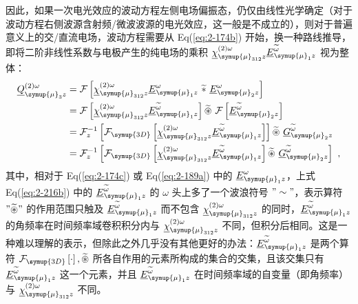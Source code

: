 因此，如果一次电光效应的波动方程左侧电场偏振态，仍仅由线性光学确定（对于波动方程右侧波源含射频/微波波源的电光效应，这一般是不成立的），则对于普遍意义上的交/直流电场，波动方程需要从 Eq(\ref{eq:2-174b}) 开始，换一种路线推导，即将二阶非线性系数与电极产生的纯电场的乘积 ${\underline{\chi}}^{(2)\omega}_{ {\symup{\mu}}_{312}z} \underline{E}^{\widetilde{\omega}}_{{\symup{\mu}}_1 z}$ 视为整体：
\begin{subequations} \label{eq:2-216}
	\abovedisplayskip=10pt
	\belowdisplayskip=10pt
	\begin{align}
		{\underline{Q}}^{(2)\omega}_{{\symup{\mu}}_{3}z} &= \mathcal F \left[ {\underline{\chi}}^{(2)\omega}_{ {\symup{\mu}}_{312}z} \underline{E}^\omega_{{\symup{\mu}}_1 z}\ \widetilde *\ \underline{E}^\omega_{{\symup{\mu}}_2 z} \right] \label{eq:2-216a} \\ &= \mathcal F \left[ {\underline{\chi}}^{(2)\omega}_{ {\symup{\mu}}_{312}z} \underline{E}^{\widetilde{\omega}}_{{\symup{\mu}}_1 z} \right] \widetilde \circledast\ \mathcal F \left[ \underline{E}^{\widetilde{\omega}}_{{\symup{\mu}}_2 z} \right]  \label{eq:2-216b} \\ &=\mathcal F^{-1}_{z} \left[ \mathcal F_{\symup{3D}} \left[ {\underline{\chi}}^{(2)\omega}_{ {\symup{\mu}}_{312}z} \underline{E}^{\widetilde{\omega}}_{{\symup{\mu}}_1 z} \right] \right] \widetilde \circledast\ \underline{G}^{\widetilde{\omega}}_{{\symup{\mu}}_2 z} \label{eq:2-216c} \\ &=\mathcal F^{-1}_{z} \left[ \mathcal F_{\symup{3D}} \left[ {\underline{\chi}}^{(2)\omega}_{ {\symup{\mu}}_{312}z} \underline{E}^{\widetilde{\omega}}_{{\symup{\mu}}_1 z} \right] \widetilde \circledast\ \underline{G}^{\widetilde{\omega}}_{{\symup{\mu}}_2 z} \right] \label{eq:2-216d}~,
	\end{align}
\end{subequations}
其中，相对于 Eq(\ref{eq:2-174c}) 或 Eq(\ref{eq:2-189a}) 中的 $\underline{E}^\omega_{{\symup{\mu}}_1 z}$，上式 Eq(\ref{eq:2-216b}) 中的 $\underline{E}^{\widetilde{\omega}}_{{\symup{\mu}}_1 z}$ 的 $\omega$ 头上多了一个波浪符号 $"\sim"$，表示算符 $"\widetilde \circledast"$ 的作用范围只触及 $\underline{E}^{\widetilde{\omega}}_{{\symup{\mu}}_1 z}$ 而不包含 ${\underline{\chi}}^{(2)\omega}_{ {\symup{\mu}}_{312}z}$ 的同时，$\underline{E}^{\widetilde{\omega}}_{{\symup{\mu}}_1 z}$ 的角频率在时间频率域卷积积分内与 ${\underline{\chi}}^{(2)\omega}_{ {\symup{\mu}}_{312}z}$ 不同，但积分后相同。这是一种难以理解的表示，但除此之外几乎没有其他更好的办法：$\underline{E}^{\widetilde{\omega}}_{{\symup{\mu}}_1 z}$ 是两个算符 $\mathcal F_{\symup{3D}} \left[ \cdot \right], \widetilde \circledast$ 所各自作用的元素所构成的集合的交集，且该交集只有 $\underline{E}^{\widetilde{\omega}}_{{\symup{\mu}}_1 z}$ 这一个元素，并且 $\underline{E}^{\widetilde{\omega}}_{{\symup{\mu}}_1 z}$ 在时间频率域的自变量（即角频率）与 ${\underline{\chi}}^{(2)\omega}_{ {\symup{\mu}}_{312}z}$ 不同。

